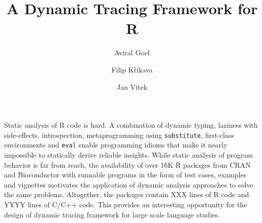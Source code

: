 \documentclass[acmsmall,review]{acmart}
\title{A Dynamic Tracing Framework for R}
\author{Aviral Goel}
\affiliation{
  \institution{Northeastern University}
  \country{USA}
}
\author{Filip Křikava}
\affiliation{
  \institution{Czech Technical University}
  \country{Czechia}
}
\author{Jan Vitek}
\affiliation{
  \institution{Northeastern University}
  \country{USA}
}
\affiliation{
  \institution{Czech Technical University}
  \country{Czechia}
}
\newcommand{\code}[1]{\lstinline|#1|\xspace}
\begin{document}
\maketitle

Static analysis of R code is hard. A combination of dynamic typing, laziness
with side-effects, introspection, metaprogramming using \code{substitute},
first-class environments and \code{eval} enable programming idioms that make it
nearly impossible to statically derive reliable insights. While static analysis
of program behavior is far from reach, the availability of over 16K R packages
from CRAN and Bioconductor with runnable programs in the form of test cases,
examples and vignettes motivates the application of dynamic analysis approaches
to solve the same problems. Altogether, the packages contain XXX lines of R code
and YYYY lines of C/C++ code. This provides an interesting opportunity for the
design of dynamic tracing framework for large scale language studies.
\end{document}
